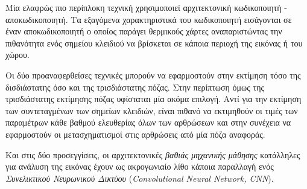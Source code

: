 Μία ελαφρώς πιο περίπλοκη τεχνική χρησιμοποιεί αρχιτεκτονική κωδικοποιητή - αποκωδικοποιητή. Τα εξαγόμενα χαρακτηριστικά του κωδικοποιητή εισάγονται σε έναν αποκωδικοποιητή ο οποίος παράγει θερμικούς χάρτες αναπαριστώντας την πιθανότητα ενός σημείου κλειδιού να βρίσκεται σε κάποια περιοχή της εικόνας ή του χώρου.

Οι δύο προαναφερθείσες τεχνικές μπορούν να εφαρμοστούν στην εκτίμηση τόσο της δισδιάστατης όσο και της τρισδιάστατης πόζας. Στην περίπτωση όμως της τρισδιάστατης εκτίμησης πόζας υφίσταται μία ακόμα επιλογή. Αντί για την εκτίμηση των συντεταγμένων των σημείων κλειδιών, είναι πιθανό να εκτιμηθούν οι τιμές των παραμέτρων κάθε βαθμού ελευθερίας όλων των αρθρώσεων και στην συνέχεια να εφαρμοστούν οι μετασχηματισμοί στις αρθρώσεις από μία πόζα αναφοράς.

Και στις δύο προσεγγίσεις, οι αρχιτεκτονικές \textsl{βαθιάς μηχανικής μάθησης} κατάλληλες για ανάλυση της εικόνας έχουν ως ακρογωνιαίο λίθο κάποια παραλλαγή ενός \textsl{Συνελικτικού Νευρωνικού Δικτύου} (\textsl{Convolutional Neural Network, CNN}).
